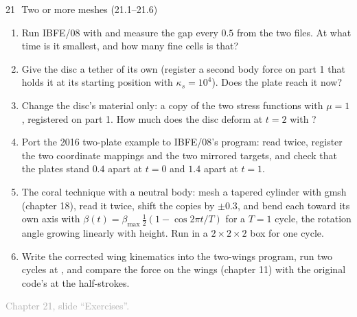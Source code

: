 \documentclass[aspectratio=169,11pt]{beamer}
\newcommand{\sourcecredit}[1]{\vfill\begin{flushright}\tiny\textcolor{DarkGray}{#1}\end{flushright}}
\begin{document}
\begin{frame}{21\,\textbullet\ Two or more meshes (21.1--21.6)}
\label{fr:c21x1}
\footnotesize
\begin{enumerate}
  \item[21.1] Run IBFE/08 with  and measure the gap every $0.5$ from the two files. At what time is it smallest, and how many fine cells is that?
  \item[21.2] Give the disc a tether of its own (register a second body force on part 1 that holds it at its starting position with $\kappa_s = 10^4$). Does the plate reach it now?
  \item[21.3] Change the disc's material only: a copy of the two stress functions with $\mu = 1$, registered on part 1. How much does the disc deform at $t = 2$ with ?
  \item[21.4] Port the 2016 two-plate example to IBFE/08's program: read  twice, register the two coordinate mappings and the two mirrored targets, and check that the plates stand $0.4$ apart at $t = 0$ and $1.4$ apart at $t = 1$.
  \item[21.5] The coral technique with a neutral body: mesh a tapered cylinder with gmsh (chapter 18), read it twice, shift the copies by $\pm0.3$, and bend each toward its own axis with $\beta(t) = \beta_{\max}\,\tfrac12(1 - \cos 2\pi t/T)$ for a $T = 1$ cycle, the rotation angle growing linearly with height. Run in a $2\times2\times2$ box for one cycle.
  \item[21.6] Write the corrected wing kinematics into the two-wings program, run two cycles at , and compare the force on the wings (chapter 11) with the original code's at the half-strokes.
\end{enumerate}
\sourcecredit{Chapter 21, slide ``Exercises''.}
\end{frame}
\end{document}
